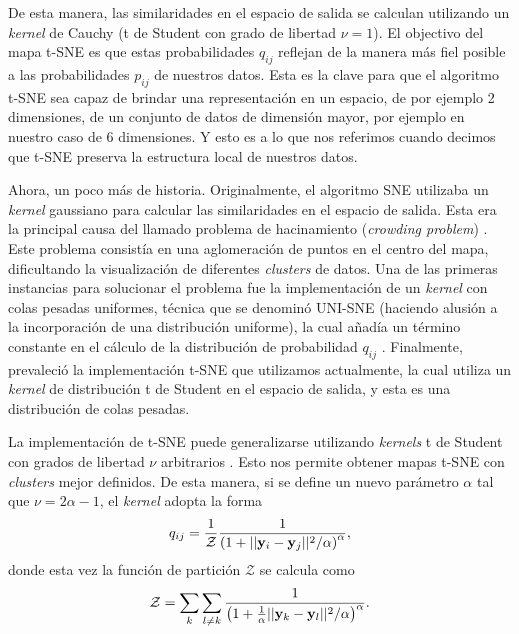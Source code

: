 De esta manera, las similaridades en el espacio de salida se calculan utilizando un \textit{kernel} de Cauchy (t de Student con grado de libertad $\nu = 1$). El objectivo del mapa t-SNE es que estas probabilidades $q_{ij}$ reflejan de la manera más fiel posible a las probabilidades $p_{ij}$ de nuestros datos. Esta es la clave para que el algoritmo t-SNE sea capaz de brindar una representación en un espacio, de por ejemplo 2 dimensiones, de un conjunto de datos de dimensión mayor, por ejemplo en nuestro caso de 6 dimensiones. Y esto es a lo que nos referimos cuando decimos que t-SNE preserva la estructura local de nuestros datos.

Ahora, un poco más de historia. Originalmente, el algoritmo SNE utilizaba un \textit{kernel} gaussiano para calcular las similaridades en el espacio de salida. Esta era la principal causa del llamado problema de hacinamiento (\textit{crowding problem}) \cite{hinton_sne, vdm_tsne}. Este problema consistía en una aglomeración de puntos en el centro del mapa, dificultando la visualización de diferentes \textit{clusters} de datos. Una de las primeras instancias para solucionar el problema fue la implementación de un \textit{kernel} con colas pesadas uniformes, técnica que se denominó UNI-SNE (haciendo alusión a la incorporación de una distribución uniforme), la cual añadía un término constante en el cálculo de la distribución de probabilidad $q_{ij}$ \cite{cook_unisne}. Finalmente, prevaleció la implementación t-SNE que utilizamos actualmente, la cual utiliza un \textit{kernel} de distribución t de Student en el espacio de salida, y esta es una distribución de colas pesadas.

La implementación de t-SNE puede generalizarse utilizando \textit{kernels} t de Student con grados de libertad $\nu$ arbitrarios \cite{kobak_heavy_tail}. Esto nos permite obtener mapas t-SNE con \textit{clusters} mejor definidos. De esta manera, si se define un nuevo parámetro $\alpha$ tal que $\nu = 2\alpha - 1$, el \textit{kernel} adopta la forma
\begin{equation}
    q_{ij} = \frac{1}{\mathcal{Z}} \frac{1}{\left(1+||\vb{y}_i-\vb{y}_j||^2/\alpha\right)^\alpha},
\end{equation}
donde esta vez la función de partición $\mathcal{Z}$ se calcula como
\begin{equation}
    \mathcal{Z} = \sum_{k} \sum_{l\neq k} \frac{1}{ \left(1 + \frac{1}{\alpha}||\vb{y}_k - \vb{y}_l||^2 / \alpha \right)^\alpha}.
\end{equation}

